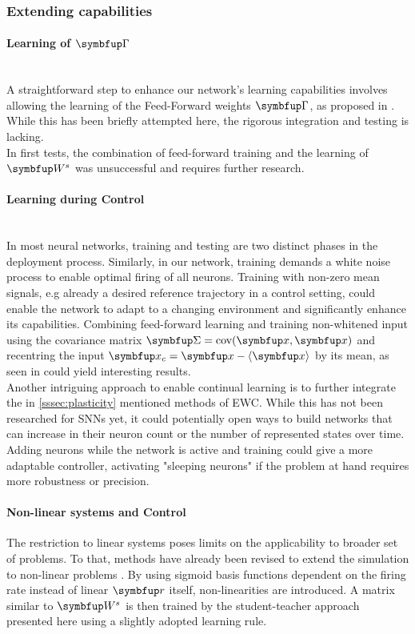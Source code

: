 \subsubsection{Extending capabilities}
\paragraph{Learning of  $\bmu{\Gamma}$}\mbox{}\\
A straightforward step to enhance our network's learning capabilities involves allowing the learning of the Feed-Forward weights $\bmu{\Gamma}$, as proposed in \cite{brendel_learning_2020}. While this has been briefly attempted here, the rigorous integration and testing is lacking.\\
In first tests, the combination of feed-forward training and the learning of $\bmu{W}^s$ was unsuccessful and requires further research.
\paragraph{Learning during Control}\mbox{}\\
In most neural networks, training and testing are two distinct phases in the deployment process. Similarly, in our network, training demands a white noise process to enable optimal firing of all neurons. Training with non-zero mean signals, e.g already a desired reference trajectory in a control setting, could enable the network to adapt to a changing environment and significantly enhance its capabilities. Combining feed-forward learning and training non-whitened input using the covariance matrix $\bmu{\Sigma} = \text{cov}(\bmu{x},\bmu{x})$ and recentring the input $\bmu{x
}_c = \bmu{x} - \langle \bmu{x}\rangle$ by its mean, as seen in \cite{vertechi_unsupervised_2014} could yield interesting results.\\

Another intriguing approach to enable continual learning is to further integrate the in \cref{sssec:plasticity} mentioned methods of \ac{EWC}. While this has not been researched for \acp{SNN} yet, it could potentially open ways to build networks that can increase in their neuron count or the number of represented states over time. Adding neurons while the network is active and training could give a more adaptable controller, activating "sleeping neurons" if the problem at hand requires more robustness or precision.\\

\paragraph{Non-linear systems and Control}
The restriction to linear systems poses limits on the applicability to broader set of problems. To that, methods have already been revised to extend the simulation to non-linear problems \cite{alemi_learning_2017}. By using sigmoid basis functions dependent on the firing rate instead of linear $\bmu{r}$ itself, non-linearities are introduced. A matrix similar to $\bmu{W}^s$ is then trained by the student-teacher approach presented here using a slightly adopted learning rule.

